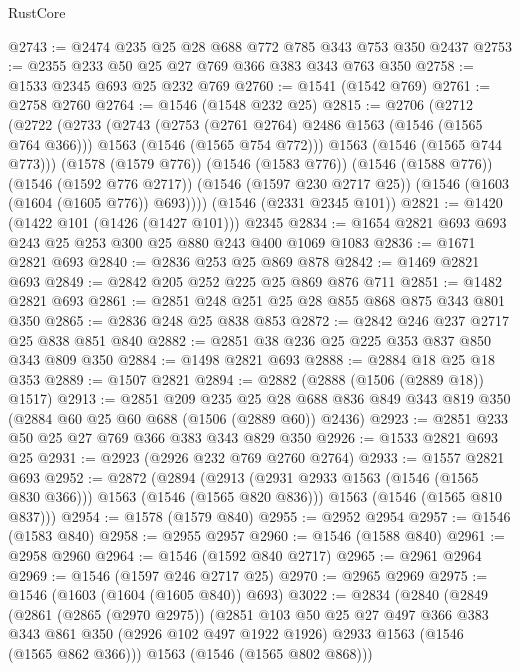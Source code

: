 \begin{lexlean}{RustCore}
\begin{coremodule}
@2743 := @2474 @235 @25 @28 @688 @772 @785 @343 @753 @350 @2437
@2753 := @2355 @233 @50 @25 @27 @769 @366 @383 @343 @763 @350
@2758 := @1533 @2345 @693 @25 @232 @769
@2760 := @1541 (@1542 @769)
@2761 := @2758 @2760
@2764 := @1546 (@1548 @232 @25)
@2815 := @2706
    (@2712
      (@2722
        (@2733
          (@2743
            (@2753 (@2761 @2764) @2486 @1563 (@1546 (@1565 @764 @366)))
            @1563
            (@1546 (@1565 @754 @772)))
          @1563
          (@1546 (@1565 @744 @773)))
        (@1578 (@1579 @776))
        (@1546 (@1583 @776))
        (@1546 (@1588 @776))
        (@1546 (@1592 @776 @2717))
        (@1546 (@1597 @230 @2717 @25))
        (@1546 (@1603 (@1604 (@1605 @776)) @693))))
    (@1546 (@2331 @2345 @101))
@2821 := @1420 (@1422 @101 (@1426 (@1427 @101))) @2345
@2834 := @1654 @2821 @693 @693 @243 @25 @253 @300 @25 @880 @243 @400 @1069 @1083
@2836 := @1671 @2821 @693
@2840 := @2836 @253 @25 @869 @878
@2842 := @1469 @2821 @693
@2849 := @2842 @205 @252 @225 @25 @869 @876 @711
@2851 := @1482 @2821 @693
@2861 := @2851 @248 @251 @25 @28 @855 @868 @875 @343 @801 @350
@2865 := @2836 @248 @25 @838 @853
@2872 := @2842 @246 @237 @2717 @25 @838 @851 @840
@2882 := @2851 @38 @236 @25 @225 @353 @837 @850 @343 @809 @350
@2884 := @1498 @2821 @693
@2888 := @2884 @18 @25 @18 @353
@2889 := @1507 @2821
@2894 := @2882 (@2888 (@1506 (@2889 @18)) @1517)
@2913 := @2851
    @209
    @235
    @25
    @28
    @688
    @836
    @849
    @343
    @819
    @350
    (@2884 @60 @25 @60 @688 (@1506 (@2889 @60)) @2436)
@2923 := @2851 @233 @50 @25 @27 @769 @366 @383 @343 @829 @350
@2926 := @1533 @2821 @693 @25
@2931 := @2923 (@2926 @232 @769 @2760 @2764)
@2933 := @1557 @2821 @693
@2952 := @2872
    (@2894
      (@2913 (@2931 @2933 @1563 (@1546 (@1565 @830 @366))) @1563 (@1546 (@1565 @820 @836)))
      @1563
      (@1546 (@1565 @810 @837)))
@2954 := @1578 (@1579 @840)
@2955 := @2952 @2954
@2957 := @1546 (@1583 @840)
@2958 := @2955 @2957
@2960 := @1546 (@1588 @840)
@2961 := @2958 @2960
@2964 := @1546 (@1592 @840 @2717)
@2965 := @2961 @2964
@2969 := @1546 (@1597 @246 @2717 @25)
@2970 := @2965 @2969
@2975 := @1546 (@1603 (@1604 (@1605 @840)) @693)
@3022 := @2834
    (@2840
      (@2849
        (@2861
          (@2865 (@2970 @2975))
          (@2851
            @103
            @50
            @25
            @27
            @497
            @366
            @383
            @343
            @861
            @350
            (@2926 @102 @497 @1922 @1926)
            @2933
            @1563
            (@1546 (@1565 @862 @366)))
          @1563
          (@1546 (@1565 @802 @868)))

\end{coremodule}
\end{lexlean}
